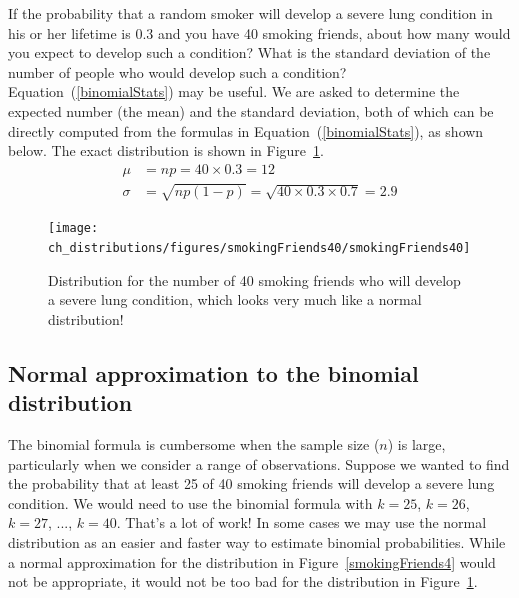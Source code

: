 \begin{example}{If the probability that a random smoker will develop a severe lung condition in his or her lifetime is $0.3$ and you have 40 smoking friends, about how many would you expect to develop such a condition? What is the standard deviation of the number of people who would develop such a condition? Equation~(\ref{binomialStats}) may be useful.}
We are asked to determine the expected number (the mean) and the standard deviation, both of which can be directly computed from the formulas in Equation~(\ref{binomialStats}), as shown below. The exact distribution is shown in Figure~\ref{smokingFriends40}.
 \begin{align*}
\mu&=np = 40\times 0.3 = 12 \\
 \sigma &= \sqrt{np(1-p)} = \sqrt{40\times 0.3\times 0.7} = 2.9
\end{align*}
\end{example}

\begin{figure}[ht]
\centering
\texttt{[image: ch\_distributions/figures/smokingFriends40/smokingFriends40]}
\caption{Distribution for the number of 40 smoking friends who will develop a severe lung condition, which looks very much like a normal distribution!} %
\label{smokingFriends40}
\end{figure}


\subsection{Normal approximation to the binomial distribution}


The binomial formula is cumbersome when the sample size ($n$) is large, particularly when we consider a range of observations. Suppose we wanted to find the probability that at least 25 of 40 smoking friends will develop a severe lung condition. We would need to use the binomial formula with $k=25$, $k=26$, $k=27$, ..., $k=40$. That's a lot of work! In some cases we may use the normal distribution as an easier and faster way to estimate binomial probabilities. While a normal approximation for the distribution in Figure~\ref{smokingFriends4} would not be appropriate, it would not be too bad for the distribution in Figure~\ref{smokingFriends40}.

